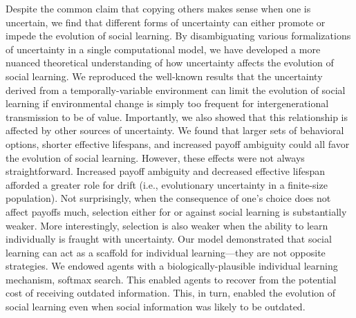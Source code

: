 \documentclass[letterpaper,11.5pt]{scrartcl}
\newcommand{\cm}[1]{{\textcolor{mypurple} {({\tiny CM:} #1)}}}
\begin{document}
 Despite the common claim that copying others makes sense when one is uncertain, we find that different forms of uncertainty can
 either promote or impede the evolution of social learning. By disambiguating various formalizations of uncertainty in a single
 computational model, we have developed a more nuanced theoretical understanding of how uncertainty affects the evolution of social learning. %
We reproduced the well-known results that the uncertainty derived from a temporally-variable environment can limit the evolution of social learning if environmental change is simply too frequent for intergenerational transmission to be of value. Importantly, we also showed that this relationship is affected by other sources of uncertainty. 
We found that larger sets of behavioral options, shorter effective lifespans, and increased payoff ambiguity could all favor the
evolution of social learning. However, these effects were not always straightforward. Increased payoff ambiguity and decreased
effective lifespan afforded a greater role for drift (i.e., evolutionary uncertainty in a finite-size population). Not surprisingly,
when the consequence of one's choice does not affect payoffs much, selection either for or against social learning is substantially
weaker. More interestingly, selection is also weaker when the ability to learn individually is fraught with uncertainty. Our model demonstrated that social learning can act as a scaffold for individual learning---they are not opposite strategies. We endowed agents with a biologically-plausible individual learning mechanism, softmax search. This enabled agents to recover from the potential cost of receiving outdated information. This, in turn, enabled the evolution of social learning even when social information was likely to be outdated. 

\end{document}

